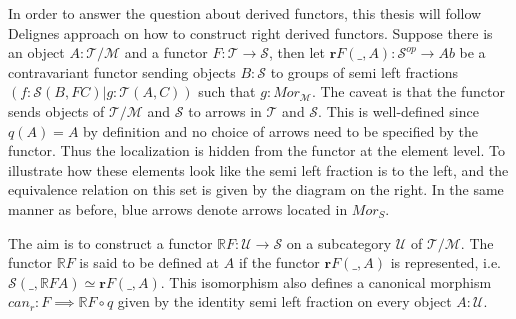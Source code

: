         \begin{center}
        \end{center}

        In order to answer the question about derived functors, this thesis will follow Delignes approach on how to construct right derived functors. Suppose there is an object $A:\mathcal{T}/\mathcal{M}$ and a functor $F:\mathcal{T}\rightarrow\mathcal{S}$, then let $\textbf{r}$$F(\_,A):\mathcal{S}^{op}\rightarrow Ab$ be a contravariant functor sending objects $B:\mathcal{S}$ to groups of semi left fractions $(f:\mathcal{S}(B,FC)|g:\mathcal{T}(A,C))$ such that $g:Mor_{\mathcal{M}}$. The caveat is that the functor sends objects of $\mathcal{T}/\mathcal{M}$ and $\mathcal{S}$ to arrows in $\mathcal{T}$ and $\mathcal{S}$. This is well-defined since $q(A)=A$ by definition and no choice of arrows need to be specified by the functor. Thus the localization is hidden from the functor at the element level. To illustrate how these elements look like the semi left fraction is to the left, and the equivalence relation on this set is given by the diagram on the right. In the same manner as before, blue arrows denote arrows located in $Mor_{S}$.

        \begin{center}
        \end{center}
        
        The aim is to construct a functor $\mathbb{R}F:\mathcal{U}\rightarrow \mathcal{S}$ on a subcategory $\mathcal{U}$ of $\mathcal{T}/\mathcal{M}$. The functor $\mathbb{R}F$ is said to be defined at $A$ if the functor $\textbf{r} F(\_,A)$ is represented, i.e. $\mathcal{S}(\_,\mathbb{R}FA)\simeq$$\textbf{r}$$F(\_,A)$. This isomorphism also defines a canonical morphism $can_r:F\implies \mathbb{R}F\circ q$ given by the identity semi left fraction on every object $A:\mathcal{U}$.
        
